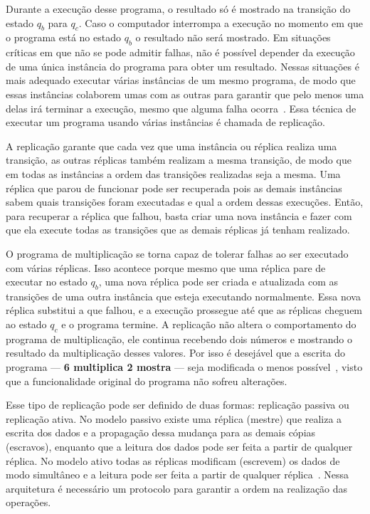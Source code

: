 Durante a execução desse programa, o resultado só é mostrado na transição do estado $q_b$ para $q_c$. Caso o computador interrompa a execução no momento em que o programa está no estado $q_b$ o resultado não será mostrado. Em situações críticas em que não se pode admitir falhas, não é possível depender da execução de uma única instância do programa para obter um resultado. Nessas situações é mais adequado executar várias instâncias de um mesmo programa, de modo que essas instâncias colaborem umas com as outras para garantir que pelo menos uma delas irá terminar a execução, mesmo que alguma falha ocorra~\cite{cachin2011introduction}. Essa técnica de executar um programa usando várias instâncias é chamada de replicação.

A replicação garante que cada vez que uma instância ou réplica realiza uma transição, as outras réplicas também realizam a mesma transição, de modo que em todas as instâncias a ordem das transições realizadas seja a mesma. Uma réplica que parou de funcionar pode ser recuperada pois as demais instâncias sabem quais transições foram executadas e qual a ordem dessas execuções. Então, para recuperar a réplica que falhou, basta criar uma nova instância e fazer com que ela execute todas as transições que as demais réplicas já tenham realizado.

O programa de multiplicação se torna capaz de tolerar falhas ao ser executado com várias réplicas. Isso acontece porque mesmo que uma réplica pare de executar no estado $q_b$, uma nova réplica pode ser criada e atualizada com as transições de uma outra instância que esteja executando normalmente. Essa nova réplica substitui a que falhou, e a execução prossegue até que as réplicas cheguem ao estado $q_c$ e o programa termine. A replicação não altera o comportamento do programa de multiplicação, ele continua recebendo dois números e mostrando o resultado da multiplicação desses valores. Por isso é desejável que a escrita do programa --- \textbf{6 multiplica 2 mostra} --- seja modificada o menos possível~\cite{vieira2010implementation}, visto que a funcionalidade original do programa não sofreu alterações.

Esse tipo de replicação pode ser definido de duas formas: replicação passiva ou replicação ativa. No modelo passivo existe uma réplica (mestre) que realiza a escrita dos dados e a propagação dessa mudança para as demais cópias (escravos), enquanto que a leitura dos dados pode ser feita a partir de qualquer réplica. No modelo ativo todas as réplicas modificam (escrevem) os dados de modo simultâneo e a leitura pode ser feita a partir de qualquer réplica~\cite{schneider1990implementing}. Nessa arquitetura é necessário um protocolo para garantir a ordem na realização das operações. 

